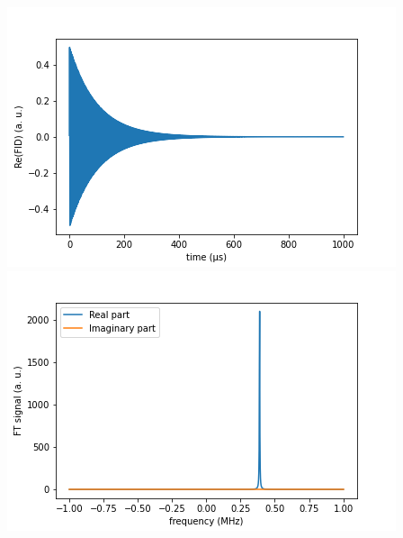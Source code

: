 \documentclass[10pt]{beamer}
\begin{document}
\begin{frame}
\begin{columns}[T]
\begin{column}{.5\textwidth}
\begin{column}{.5\textwidth}
\end{column}
\end{column}
\begin{column}{.5\textwidth}
\includegraphics[width=\textwidth]{./spin1-2/32correlated_pure_dipD2/FIDSignal.png}
\includegraphics[width=\textwidth]{./spin1-2/32correlated_pure_dipD2/FTSignal.png}
\end{column}
\end{columns}
\end{frame}
\end{document}
